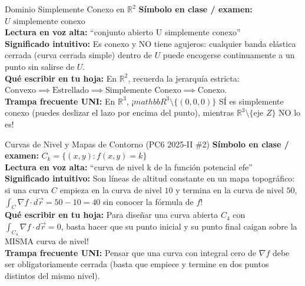 \documentclass[11pt,a4paper]{article}
\begin{document}
\begin{definicionbox}{Dominio Simplemente Conexo en $\mathbb{R}^2$}
\textbf{Símbolo en clase / examen:} $U \text{ simplemente conexo}$\\[0.15cm]
\textbf{Lectura en voz alta:} ``conjunto abierto U simplemente conexo''\\[0.12cm]
\textbf{Significado intuitivo:} Es conexo y NO tiene agujeros: cualquier banda elástica cerrada (curva cerrada simple) dentro de $U$ puede encogerse continuamente a un punto sin salirse de $U$.\\[0.12cm]
\textbf{Qué escribir en tu hoja:} En $\mathbb{R}^2$, recuerda la jerarquía estricta: $\text{Convexo} \implies \text{Estrellado} \implies \text{Simplemente Conexo} \implies \text{Conexo}$.\\[0.12cm]
\textbf{Trampa frecuente UNI:} En $\mathbb{R}^3$, ¡$mathbb{R}^3 \setminus \{(0,0,0)\}$ SÍ es simplemente conexo (puedes deslizar el lazo por encima del punto), mientras $\mathbb{R}^3 \setminus \{\text{eje } Z\}$ NO lo es!
\end{definicionbox}

\begin{definicionbox}{Curvas de Nivel y Mapas de Contorno (PC6 2025-II \#2)}
\textbf{Símbolo en clase / examen:} $C_k = \{(x,y) : f(x,y) = k\}$\\[0.15cm]
\textbf{Lectura en voz alta:} ``curva de nivel k de la función potencial efe''\\[0.12cm]
\textbf{Significado intuitivo:} Son líneas de altitud constante en un mapa topográfico: si una curva $C$ empieza en la curva de nivel $10$ y termina en la curva de nivel $50$, $\int_C \nabla f\cdot d\vec{r} = 50 - 10 = 40$ sin conocer la fórmula de $f$!\\[0.12cm]
\textbf{Qué escribir en tu hoja:} Para diseñar una curva abierta $C_4$ con $\int_{C_4} \nabla f\cdot d\vec{r} = 0$, basta hacer que su punto inicial y su punto final caigan sobre la MISMA curva de nivel!\\[0.12cm]
\textbf{Trampa frecuente UNI:} Pensar que una curva con integral cero de $\nabla f$ debe ser obligatoriamente cerrada (basta que empiece y termine en dos puntos distintos del mismo nivel).
\end{definicionbox}
\end{document}
